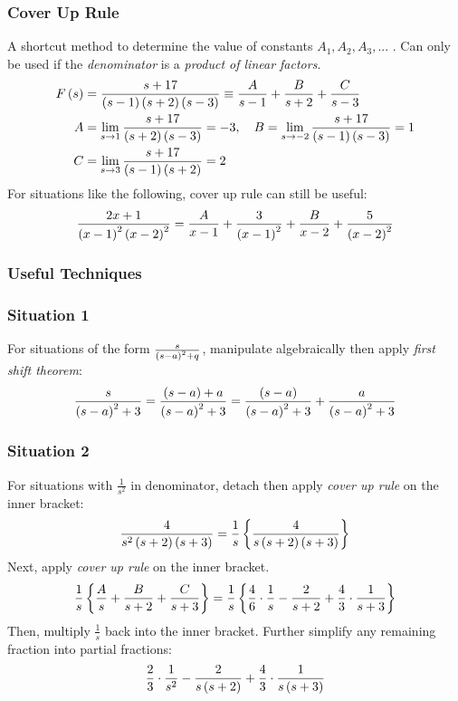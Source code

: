 \subsubsection{Cover Up Rule}
A shortcut method to determine the value of constants $A_1,A_2,A_3,...$ . Can only be used if the \textit{denominator} is a \textit{product of linear factors}.
\begin{align}
    F\left(s\right)&=\frac{s+17}{\left(s-1\right)\left(s+2\right)\left(s-3\right)}\equiv\frac{A}{s-1}+\frac{B}{s+2}+\frac{C}{s-3}\nonumber\\
    A&=\lim\limits_{s\to1}\frac{s+17}{\left(s+2\right)\left(s-3\right)}=-3,\quad B=\lim\limits_{s\to-2}\frac{s+17}{\left(s-1\right)\left(s-3\right)}=1\nonumber\\   
    C&=\lim\limits_{s\to3}\frac{s+17}{\left(s-1\right)\left(s+2\right)}=2\nonumber
\end{align}
For situations like the following, cover up rule can still be useful:
\begin{equation}
    \frac{2x+1}{\left(x-1\right)^2\left(x-2\right)^2}=\frac{A}{x-1}+\frac{3}{\left(x-1\right)^2}+\frac{B}{x-2}+\frac{5}{\left(x-2\right)^2}
\end{equation}
\subsubsection{Useful Techniques}
\subsubsection*{Situation 1}
For situations of the form $\frac{s}{\left(s-a\right)^2+q}$, manipulate algebraically then apply \textit{first shift theorem}:
\begin{equation}
    \frac{s}{\left(s-a\right)^2+3}=\frac{\left(s-a\right)+a}{\left(s-a\right)^2+3}=\frac{\left(s-a\right)}{\left(s-a\right)^2+3}+\frac{a}{\left(s-a\right)^2+3}
\end{equation}
\subsubsection*{Situation 2}
For situations with $\frac{1}{s^2}$ in denominator, detach then apply \textit{cover up rule} on the inner bracket: 
\begin{equation}
    \frac{4}{s^2\left(s+2\right)\left(s+3\right)}=\frac{1}{s}\left\{\frac{4}{s\left(s+2\right)\left(s+3\right)}\right\}
\end{equation}
Next, apply \textit{cover up rule} on the inner bracket.
\begin{equation*}
    \frac{1}{s}\left\{\frac{A}{s}+\frac{B}{s+2}+\frac{C}{s+3}\right\}=\frac{1}{s}\left\{\frac{4}{6}\cdot\frac{1}{s}-\frac{2}{s+2}+\frac{4}{3}\cdot\frac{1}{s+3}\right\}
\end{equation*}
Then, multiply $\frac{1}{s}$ back into the inner bracket. Further simplify any remaining fraction into partial fractions:
\begin{equation*}
    \frac{2}{3}\cdot\frac{1}{s^2}-\frac{2}{s\left(s+2\right)}+\frac{4}{3}\cdot\frac{1}{s\left(s+3\right)}
\end{equation*}
